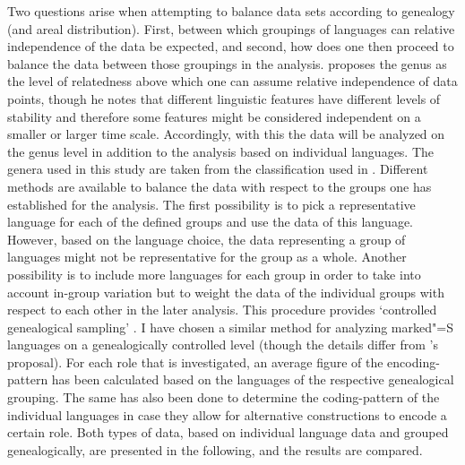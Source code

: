 Two questions arise when attempting to balance data sets according to genealogy (and areal distribution).
First, between which groupings of languages can relative independence of the data be expected, and second, how does one then proceed to balance the data between those groupings in the analysis.
\citet[267]{Dryer:1989} proposes the genus as the level of relatedness above which one can assume relative independence of data points, though he notes that different linguistic features have different levels of stability and therefore some features might be considered independent on a smaller or larger time scale. 
Accordingly, with this the data will be analyzed on the genus level in addition to the analysis based on individual languages.
The genera used in this study are taken from the classification used in \citet{WALS}. 
Different methods are available to balance the data with respect to the groups one has established for the analysis. 
The first possibility is to pick a representative language for each of the defined groups and use the data of this language. 
However, based on the language choice, the data representing a group of languages might not be representative for the group as a whole.
Another possibility is to include more languages for each group in order to take into account in-group variation but to weight the data of the individual groups with respect to each other in the later analysis. This procedure provides `controlled genealogical sampling' \citep{Bickel.samp}. 
I have chosen a similar method for analyzing marked"=S languages on a genealogically controlled level (though the details differ from \citeauthor{Bickel.samp}'s proposal). 
For each role that is investigated, an average figure of the encoding-pattern has been calculated based on the languages of the respective genealogical grouping. 
The same has also been done to determine the coding-pattern of the individual languages in case they allow for alternative constructions to encode a certain role. 
Both types of data, based on individual language data and grouped genealogically, are presented in the following, and the results are compared.
 

